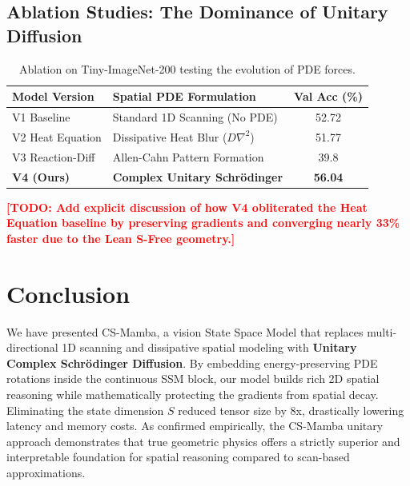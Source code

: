 \documentclass{article}
\newcommand{\cs}{CS-Mamba}
\newcommand{\todo}[1]{\textcolor{red}{\textbf{[TODO: #1]}}}
\begin{document}
\subsection{Ablation Studies: The Dominance of Unitary Diffusion}
\begin{table}[h]
\centering
\caption{Ablation on Tiny-ImageNet-200 testing the evolution of PDE forces.}
\begin{tabular}{llc}
\toprule
\textbf{Model Version} & \textbf{Spatial PDE Formulation} & \textbf{Val Acc (\%)} \\
\midrule
V1 Baseline        & Standard 1D Scanning (No PDE)  & 52.72 \\
V2 Heat Equation   & Dissipative Heat Blur ($D \nabla^2$)     & 51.77 \\
V3 Reaction-Diff   & Allen-Cahn Pattern Formation   & 39.8 \\
\textbf{V4 (Ours)} & \textbf{Complex Unitary Schrödinger} & \textbf{56.04} \\
\bottomrule
\end{tabular}
\label{tab:ablation}
\end{table}

\todo{Add explicit discussion of how V4 obliterated the Heat Equation baseline by preserving gradients and converging nearly 33\% faster due to the Lean S-Free geometry.}

\section{Conclusion}
We have presented \cs{}, a vision State Space Model that replaces multi-directional 
1D scanning and dissipative spatial modeling with \textbf{Unitary Complex Schrödinger Diffusion}. 
By embedding energy-preserving PDE rotations inside the continuous SSM block, our model 
builds rich 2D spatial reasoning while mathematically protecting the gradients from 
spatial decay. Eliminating the state dimension $S$ reduced tensor size by 8x, drastically 
lowering latency and memory costs. As confirmed empirically, the \cs{} unitary approach 
demonstrates that true geometric physics offers a strictly superior and interpretable 
foundation for spatial reasoning compared to scan-based approximations.



\end{document}
